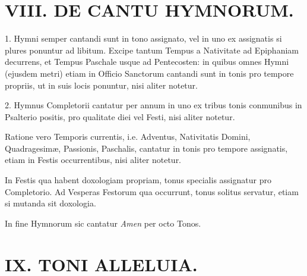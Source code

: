 \documentclass[vesperale_romanum.tex]{subfiles}
\begin{document}
\section[VIII. De Cantu Hymnorum]{VIII. DE CANTU HYMNORUM.}

1. Hymni semper cantandi sunt in tono assignato, vel in uno ex assignatis si plures ponuntur ad libitum. Excipe tantum Tempus a Nativitate ad Epiphaniam decurrens, et Tempus Paschale usque ad Pentecosten: in quibus omnes Hymni (ejusdem metri) etiam in Officio Sanctorum cantandi sunt in tonis pro tempore propriis, ut in suis locis ponuntur, nisi aliter notetur.

2. Hymnus Completorii cantatur per annum in uno ex tribus tonis conmunibus in Psalterio positis, pro qualitate diei vel Festi, nisi aliter notetur.

Ratione vero Temporis currentis, i.e. Adventus, Nativitatis Domini, Quadragesimæ, Passionis, Paschalis, cantatur in tonis pro tempore assignatis, etiam in Festis occurrentibus, nisi aliter notetur.

In Festis qua habent doxologiam propriam, tonus specialis assignatur pro Completorio. Ad Vesperas Festorum qua occurrunt, tonus solitus servatur, etiam si mutanda sit doxologia.


In fine Hymnorum sic cantatur \textit{Amen} per octo Tonos.

\altnormal


\newpage
\section[IX. Toni « Allelúia »]{IX. TONI ALLELUIA.}




\altitshape
\end{document}
